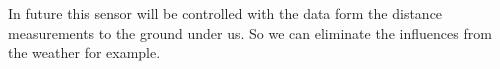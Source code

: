 In future this sensor will be controlled with the data form the distance measurements to the ground under us. So we can eliminate the influences from the weather for example.



%
%
%
%
%
%
%
